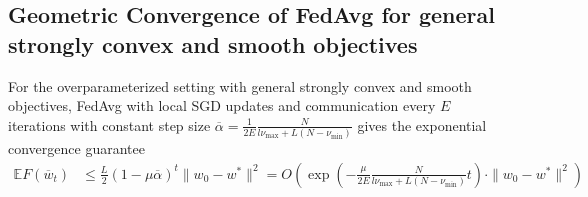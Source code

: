 
\subsection{Geometric Convergence of FedAvg for general strongly convex and smooth objectives}

\begin{thm}
	For the overparameterized setting with general strongly convex and
	smooth objectives, FedAvg with local SGD updates and communication
	every $E$ iterations with constant step size $\overline{\alpha}=\frac{1}{2E}\frac{N}{l\nu_{\max}+L(N-\nu_{\min})}$
	gives the exponential convergence guarantee 
	\begin{align*}
	\mathbb{E}F(\overline{w}_{t}) & \leq\frac{L}{2}(1-\mu\overline{\alpha})^{t}\|w_{0}-w^{\ast}\|^{2}=O(\exp(-\frac{\mu}{2E}\frac{N}{l\nu_{\max}+L(N-\nu_{\min})}t)\cdot\|w_{0}-w^{\ast}\|^{2})
	\end{align*}
\end{thm}
%
